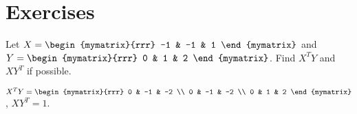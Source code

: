 \section*{Exercises}

\begin{ex}
  Let $X=\begin{mymatrix}{rrr}
    -1 & -1 & 1
  \end{mymatrix}$ and $Y=\begin{mymatrix}{rrr}
    0 & 1 & 2
  \end{mymatrix}$. Find $X^TY$ and $XY^T$ if
  possible.
  \begin{sol}
    $X^TY = \begin{mymatrix}{rrr}
      0 & -1 & -2 \\
      0 & -1 & -2 \\
      0 & 1 & 2
    \end{mymatrix}$, $XY^T = 1$.
  \end{sol}
\end{ex}

